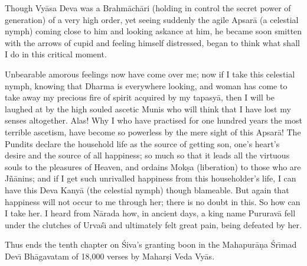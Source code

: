 Though Vy\=asa Deva was a Brahm\=ach\=ari (holding in control the secret power of generation) of a very high order, yet seeing suddenly the agile Apsar\=a (a celestial nymph) coming close to him and looking askance at him, he became soon smitten with the arrows of cupid and feeling himself distressed, began to think what shall I do in this critical moment.

Unbearable amorous feelings now have come over me; now if I take this celestial nymph, knowing that Dharma is everywhere looking, and woman has come to take away my precious fire of spirit acquired by my tapasy\=a, then I will be laughed at by the high souled ascetic Munis who will think that I have lost my senses altogether. Alas! Why I who have practised for one hundred years the most terrible ascetism, have become so powerless by the mere sight of this Apsar\=a! The Pundits declare the household life as the source of getting son, one's heart's desire and the source of all happiness; so much so that it leads all the virtuous souls to the pleasures of Heaven, and ordains Mok\d{s}a (liberation) to those who are J\~n\=anins; and if I get such unrivalled happiness from this householder's life, I can have this Deva Kany\=a (the celestial nymph) though blameable. But again that happiness will not occur to me through her; there is no doubt in this. So how can I take her. I heard from N\=arada how, in ancient days, a king name Pururav\=a fell under the clutches of Urva\'s\={\i} and ultimately felt great pain, being defeated by her.

Thus ends the tenth chapter on \'Siva's granting boon in the Mahapur\=a\d{n}a \'Sr\={\i}mad Dev\={\i} Bh\=agavatam of 18,000 verses by Mahar\d{s}i Veda Vy\=as.



